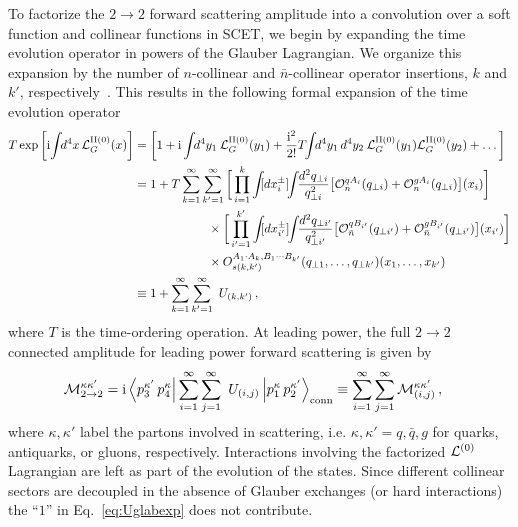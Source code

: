 \documentclass[letterpaper,11pt]{article}
\newcommand{\eq}[1]{Eq.~\eqref{eq:#1}}
\newcommand{\img}{\mathrm{i}}
\newcommand{\cM}{\mathcal{M}}
\newcommand{\nn}{\nonumber}
\newcommand{\bn}{{\bar n}}
\begin{document}
To factorize the $2\to2$ forward scattering amplitude into a convolution over a soft function and collinear functions in SCET, we begin by expanding the time evolution operator in powers of the Glauber Lagrangian. We organize this expansion  by the number of $n$-collinear and $\bn$-collinear operator insertions, $k$ and $k'$, respectively~\cite{Rothstein:2016bsq}. This results in the following formal expansion of the time evolution operator 
%
\begin{align} \label{eq:Uglabexp}
  T \exp \left[ \img\! \int\!\! d^4x\, {\cal L}_G^{\rm II(0)}(x)  \right]
   &=\bigg[ 1 + \img \int\!\! d^4y_1\: {\cal L}_G^{\rm II(0)}(y_1) + \frac{\img^2}{2!} T\!\! \int\!\! d^4y_1\, d^4y_2\: {\cal L}_G^{\rm II(0)}(y_1) {\cal L}_G^{\rm II(0)}(y_2) + \ldots \bigg]
  \nn\\
   &= 1 + 
   T \sum_{k=1}^\infty \sum_{k'=1}^\infty   
     \bigg[  \prod_{i=1}^{k} \int\!\! [dx_i^\pm]\!\! \int\!\! \frac{d^2q_{\perp i}}{q_{\perp i}^2}
      \big[{\cal O}_n^{q A_i}(q_{\perp i}) + {\cal O}_n^{g A_i}(q_{\perp i})\big](x_i) \bigg]
  \nn\\
  &\qquad\qquad\qquad \times 
  \bigg[ \prod_{i'=1}^{k'} \int\!\! [dx_{i'}^\pm]\!\!\int\!\! \frac{d^2q_{\perp i'}}{q_{\perp i'}^2} 
  \big[{\cal O}_\bn^{q B_{i'}}(q_{\perp i'}) +  {\cal O}_\bn^{g B_{i'}}(q_{\perp i'})\big](x_{i'}) \bigg]
  \nn\\
  &\qquad\qquad\qquad \times 
     O_{s(k,k')}^{A_1\cdot A_k,B_1\cdots B_{k'}}(q_{\perp 1},\ldots,q_{\perp k'})(x_1,\ldots,x_{k'})
  \nn\\
&\equiv 1 + \sum_{k=1}^\infty \sum_{k'=1}^\infty \ U_{(k,k')}
  \,, 
\end{align}
%
where $T$ is the time-ordering operation. 
At leading power, the full $2 \to 2$ connected amplitude for leading power forward scattering is given by 
%
\begin{align} \label{eq:Uglabexpn}
  \cM_{2\to 2}^{\kappa\kappa'} & = \img \left< p_3^{\kappa'}\, p_4^{\kappa} \right|  \sum_{i=1}^\infty \sum_{j=1}^\infty \ U_{(i,j)}
 \left| p_1^\kappa \, p_2^{\kappa'} \right>_{\rm conn} 
   \equiv  \sum_{i=1}^\infty \sum_{j=1}^\infty \cM_{(i,j)}^{\kappa\kappa'} 
  \,,
\end{align}
where $\kappa,\kappa'$ label the partons involved in scattering, i.e. $\kappa,\kappa'=q,\bar q,g$ for quarks, antiquarks, or gluons, respectively. Interactions involving the factorized ${\cal L}^{(0)}$ Lagrangian are left as part of the evolution of the states.
%
Since different collinear sectors are decoupled in the absence of Glauber exchanges (or hard interactions) the ``$1$'' in \eq{Uglabexp} does not contribute.  
\end{document}
